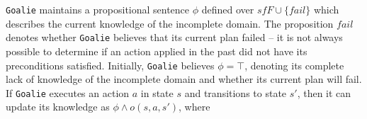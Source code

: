 \documentclass{article}
\newenvironment{packed_itemize}{
\begin{itemize}
  \setlength{\itemsep}{1pt}
  \setlength{\parskip}{0pt}
  \setlength{\parsep}{0pt}
}{\end{itemize}}
\def\goalie{{\tt Goalie}}
\begin{document}

\goalie{} maintains a propositional sentence $\phi$ defined over ${sf
F} \cup \{fail\}$ which describes the current knowledge of the
incomplete domain.  The proposition $fail$ denotes whether \goalie{} believes
that its current plan failed -- it is not always possible to determine if an
action applied in the past did not have its preconditions satisfied.  Initially,
\goalie{} believes $\phi = \top$, denoting its complete lack of knowledge of the
incomplete domain and whether its current plan will fail.    If \goalie{}
executes an action $a$ in state $s$ and transitions to state $s'$, then it can
update its knowledge as $\phi \wedge o(s, a, s')$, where
\end{document}
